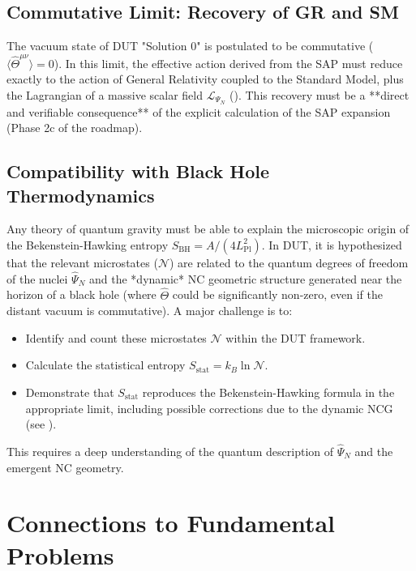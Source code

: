 \documentclass[11pt, a4paper]{article}
\theoremstyle{remark}
\newcommand{\Op}[1]{\hat{#1}}
\begin{document}
\subsection{Commutative Limit: Recovery of GR and SM}
\label{subsec:commutative_limit_final}
The vacuum state of DUT "Solution 0" is postulated to be commutative (\( \langle \Op{\Theta}^{\mu\nu} \rangle = 0 \)). In this limit, the effective action derived from the SAP must reduce exactly to the action of General Relativity coupled to the Standard Model, plus the Lagrangian of a massive scalar field \( \mathcal{L}_{\Psi_N} \) (). This recovery must be a **direct and verifiable consequence** of the explicit calculation of the SAP expansion (Phase 2c of the roadmap).

\subsection{Compatibility with Black Hole Thermodynamics}
\label{subsec:black_hole_thermo_final}
Any theory of quantum gravity must be able to explain the microscopic origin of the Bekenstein-Hawking entropy \( S_{\text{BH}} = A / (4 L_{\text{Pl}}^2) \). In DUT, it is hypothesized that the relevant microstates (\( \mathcal{N} \)) are related to the quantum degrees of freedom of the nuclei \( \Op{\Psi}_N \) and the *dynamic* NC geometric structure generated near the horizon of a black hole (where \( \Op{\Theta} \) could be significantly non-zero, even if the distant vacuum is commutative). A major challenge is to:
\begin{itemize}
    \item Identify and count these microstates \( \mathcal{N} \) within the DUT framework.
    \item Calculate the statistical entropy \( S_{\text{stat}} = k_B \ln \mathcal{N} \).
    \item Demonstrate that \( S_{\text{stat}} \) reproduces the Bekenstein-Hawking formula in the appropriate limit, including possible corrections due to the dynamic NCG (see ).
\end{itemize}
This requires a deep understanding of the quantum description of \( \Op{\Psi}_N \) and the emergent NC geometry.

\section{Connections to Fundamental Problems}
\label{sec:fundamental_problems_final}
\end{document}
